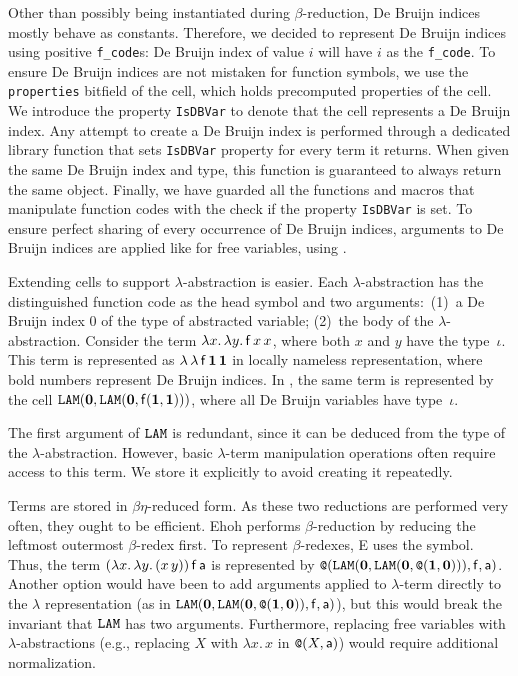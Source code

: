 Other than possibly being instantiated during $\beta$-reduction, De Bruijn
indices mostly behave as constants. Therefore, we decided to represent De
Bruijn indices using positive \texttt{f\_code}s: De Bruijn index of value $i$
will have $i$ as the \texttt{f\_code}. To ensure De Bruijn indices are not
mistaken for function symbols, we use the \texttt{properties} bitfield of the
cell, which holds precomputed properties of %
the cell. We introduce the
property \texttt{IsDBVar} to denote that the cell represents a De
Bruijn index. Any attempt to create a De Bruijn index is performed through
a dedicated library function that sets \texttt{IsDBVar} property for every term it
returns. When given the same De Bruijn index and type, this function is
guaranteed to always return the same object. Finally, we have guarded all the
functions and macros that manipulate function codes with the check if the
property \texttt{IsDBVar} is set. To ensure perfect sharing of every occurrence
of De Bruijn indices, arguments to De Bruijn indices are applied like for free
variables, using \internalat{}.

Extending cells to support $\lambda$-abstraction is easier. Each
$\lambda$-ab\-strac\-tion has the distinguished function code \internallam{} as the head
symbol and two arguments:\ (1)~a De Bruijn index 0 of the type of abstracted variable;
(2)~the body %
of the $\lambda$-abstraction. Consider
the term $\lambda x. \, \lambda y.\, \mathsf{f}\, x \, x$, where both $x$ and $y$ have
the type~$\iota$. This term is represented as $\lambda\,\lambda\, \mathsf{f} \,
\mathbf{1} \, \mathbf{1}$ in locally nameless representation, where bold numbers
represent De Bruijn indices. In \ehohii{}, the same term is represented by the cell
$\texttt{LAM}(\mathbf{0}, \texttt{LAM}(\mathbf{0}, \mathsf{f}(\mathbf{1}, \mathbf{1})))$,
where all De Bruijn variables have type~$\iota$. 

The first argument of $\texttt{LAM}$ is
redundant, since it can be deduced from the type of the $\lambda$-abstraction.
However, basic $\lambda$-term manipulation operations often require access to
this term. We store it explicitly to avoid creating it repeatedly.

Terms are stored in $\beta\eta$-reduced form. As these two reductions are
performed very often, they ought to be efficient. Ehoh
performs $\beta$-reduction by reducing the leftmost outermost $\beta$-redex
first. To represent $\beta$-redexes, E uses the \internalat{} symbol. Thus,
the term $(\lambda
x.\, \lambda y.\,  (x \, y)) \, \mathsf{f} \, \mathsf{a}$ is represented by
$\texttt{@}(\texttt{LAM}(\mathbf{0}, \texttt{LAM}(\mathbf{0}, \texttt{@}(\mathbf{1}, \mathbf{0}))),
\mathsf{f}, \mathsf{a})$. Another option would have been to add arguments applied to
$\lambda$-term directly to the $\lambda$ representation (as in
$\texttt{LAM}(\mathbf{0}, \texttt{LAM}(\mathbf{0}, \allowbreak \texttt{@}(\mathbf{1}, \mathbf{0})),
\mathsf{f}, \mathsf{a})$), but this would break the invariant
that $\texttt{LAM}$ has two arguments. Furthermore, replacing free
variables with $\lambda$-abstractions (e.g., replacing $X$ with $\lambda
x. \, x$ in $\texttt{@}(X, \mathsf{a})$) would require additional normalization.

